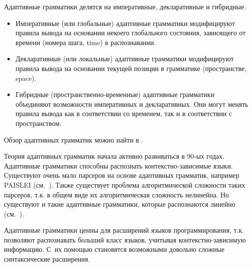 \documentclass[a4paper,12pt,titlepage]{extarticle}
\begin{document}
Адаптивные грамматики делятся на императивные, декларативные и гибридные.
\begin{itemize}
  \item Императивные (или глобальные) адаптивные грамматики модифицируют правила
  вывода на основании некоего глобального состояния, зависящего от времени
  (номера шага, time) в распознавании.
  \item Декларативные (или локальные) адаптивные грамматики модифицируют правила
  вывода на основании текущей позиции в грамматике (пространстве, space).
  \item Гибридные (пространственно-временные) адаптивные грамматики объединяют
  возможности императивных и декларативных. Они могут менять правила вывода как
  в соответствии со временем, так и в соответствии с пространством.
\end{itemize}
Обзор адаптивных грамматик можно найти в \cite{adaptive}.

Теория адаптивных грамматик начала активно развиваться в 90-ых годах.
Адаптивные грамматики способны распознать контекстно-зависимые языки.
Существуют очень мало парсеров на основе адаптивных грамматик, например PAISLEI
(см.~\cite{paislei}). Также существует проблема алгоритмической сложности таких
парсеров, т.к. в общем виде их алгоритмическая сложность нелинейна. Но
существуют и такие адаптивные грамматики, которые распознаются линейно
(см.~\cite{paislei}).

Адаптивные грамматики ценны для расширений языков программирования, т.к.
позволяют распознавать больший класс языков, учитывая контекстно-зависимую
информацию. С~их помощью становятся возможными довольно сложные синтаксические
расширения.
\end{document}
